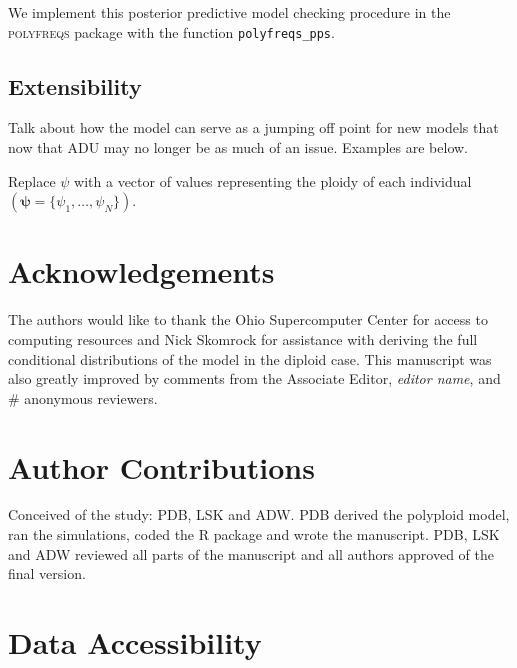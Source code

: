 \documentclass[11pt,english,letterpaper,oneside]{article}
\begin{document}
\medskip

We implement this posterior predictive model checking procedure in the \textsc{polyfreqs} package with the function \texttt{polyfreqs\_pps}.

\medskip
\subsection*{Extensibility}
\medskip

Talk about how the model can serve as a jumping off point for new models that now that ADU may no longer be as much of an issue. Examples are below.
\medskip

Replace $\psi$ with a vector of values representing the ploidy of each individual $(\bm{\psi} = \{\psi_1,\ldots,\psi_N\})$.
\medskip



\section*{Acknowledgements}           %

The authors would like to thank the Ohio Supercomputer Center for access to computing resources and Nick Skomrock for assistance with deriving the full conditional distributions of the model in the diploid case. This manuscript was also greatly improved by comments from the Associate Editor, \textit{editor name}, and \# anonymous reviewers.
\medskip



\singlespacing





\section*{Author Contributions}        %

Conceived of the study: PDB, LSK and ADW. PDB derived the polyploid model, ran the simulations, coded the R package and wrote the manuscript. PDB, LSK and ADW reviewed all parts of the manuscript and all authors approved of the final version.
\medskip

\section*{Data Accessibility}            %
\end{document}
